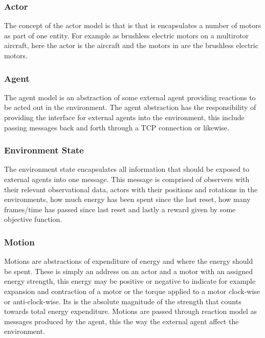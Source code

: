 \subsubsection{Actor}

The concept of the actor model is that is that is encapsulates a number of motors as part of one entity. For example as brushless electric motors on a multirotor aircraft, here the actor is the aircraft and the motors in are the brushless electric motors.

\subsubsection{Agent}

The agent model is an abstraction of some external agent providing reactions to be acted out in the environment. The agent abstraction has the responsibility of providing the interface for external agents into the environment, this include passing messages back and forth through a TCP connection or likewise. 

\subsubsection{Environment State}

The environment state encapsulates all information that should be exposed to external agents into one message. This message is comprised of observers  with their relevant observational data, actors with their positions and rotations in the environments, how much energy has been spent since the last reset, how many frames/time has passed since last reset and lastly a reward given by some objective function.


\subsubsection{Motion}

Motions are abstractions of expenditure of energy and where the energy should be spent. These is simply an address on an actor and a motor with an assigned energy strength, this energy may be positive or negative to indicate for example expansion and contraction of a motor or the torque applied to a motor clock-wise or anti-clock-wise. Its is the absolute magnitude of the strength that counts towards total energy expenditure.
Motions are passed through reaction model as messages produced by the agent, this the way the external agent affect the environment. 

